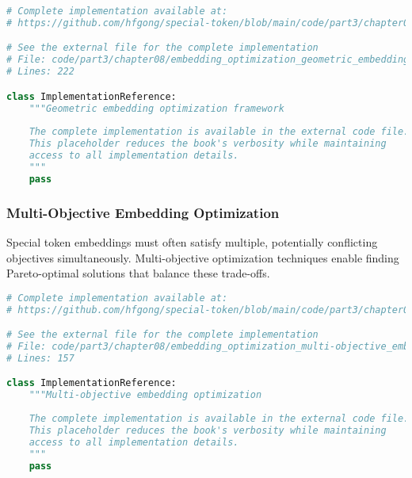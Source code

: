 \begin{lstlisting}[language=Python, caption={Geometric embedding optimization framework}]
# Complete implementation available at:
# https://github.com/hfgong/special-token/blob/main/code/part3/chapter08/embedding_optimization_geometric_embedding_optimizati.py

# See the external file for the complete implementation
# File: code/part3/chapter08/embedding_optimization_geometric_embedding_optimizati.py
# Lines: 222

class ImplementationReference:
    """Geometric embedding optimization framework
    
    The complete implementation is available in the external code file.
    This placeholder reduces the book's verbosity while maintaining
    access to all implementation details.
    """
    pass
\end{lstlisting}

\subsubsection{Multi-Objective Embedding Optimization}

Special token embeddings must often satisfy multiple, potentially conflicting objectives simultaneously. Multi-objective optimization techniques enable finding Pareto-optimal solutions that balance these trade-offs.
\begin{comment}
Feedback: A simple example would make this concept much clearer. For instance: "Consider a custom token `<CRITICAL_KEYWORD>`. We might have two competing goals for its embedding: 1) It should be close to the embeddings of the words that make up the keyword (for semantic coherence), but 2) It should also be far away from the embeddings of regular content tokens to make it easily distinguishable for the attention mechanism. Multi-objective optimization provides a framework for training the embedding to find a 'sweet spot' that balances these two pressures, rather than satisfying one at the expense of the other."
\end{comment}

\begin{lstlisting}[language=Python, caption={Multi-objective embedding optimization}]
# Complete implementation available at:
# https://github.com/hfgong/special-token/blob/main/code/part3/chapter08/embedding_optimization_multi-objective_embedding_opti.py

# See the external file for the complete implementation
# File: code/part3/chapter08/embedding_optimization_multi-objective_embedding_opti.py
# Lines: 157

class ImplementationReference:
    """Multi-objective embedding optimization
    
    The complete implementation is available in the external code file.
    This placeholder reduces the book's verbosity while maintaining
    access to all implementation details.
    """
    pass
\end{lstlisting}

